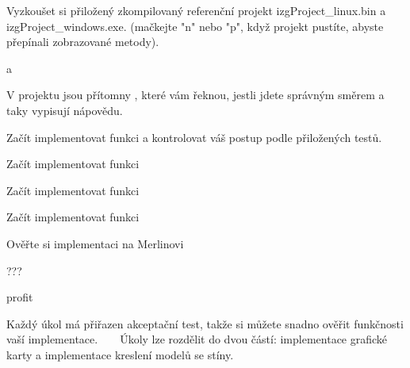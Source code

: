 \begin{DoxyEnumerate}
\item Vyzkoušet si přiložený zkompilovaný referenční projekt izg\+Project\+\_\+linux.\+bin a izg\+Project\+\_\+windows.\+exe. (mačkejte "{}n"{} nebo "{}p"{}, když projekt pustíte, abyste přepínali zobrazované metody). 
\item {} 
\item {} a  
\item V projektu jsou přítomny , které vám řeknou, jestli jdete správným směrem a taky vypisují nápovědu. 
\item Začít implementovat funkci  a kontrolovat váš postup podle přiložených testů. 
\item Začít implementovat funkci  
\item Začít implementovat funkci  
\item Začít implementovat funkci  
\item Ověřte si implementaci na Merlinovi 
\item {} 
\item ??? 
\item profit 
\end{DoxyEnumerate}

Každý úkol má přiřazen akceptační test, takže si můžete snadno ověřit funkčnosti vaší implementace. ~\newline
~\newline
 Úkoly lze rozdělit do dvou částí\+: implementace grafické karty a implementace kreslení modelů se stíny. 